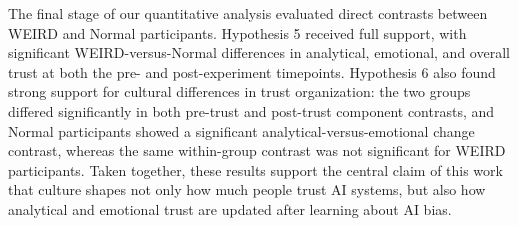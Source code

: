 The final stage of our quantitative analysis evaluated direct contrasts between WEIRD and Normal participants. Hypothesis 5 received full support, with significant WEIRD-versus-Normal differences in analytical, emotional, and overall trust at both the pre- and post-experiment timepoints. Hypothesis 6 also found strong support for cultural differences in trust organization: the two groups differed significantly in both pre-trust and post-trust component contrasts, and Normal participants showed a significant analytical-versus-emotional change contrast, whereas the same within-group contrast was not significant for WEIRD participants. Taken together, these results support the central claim of this work that culture shapes not only how much people trust AI systems, but also how analytical and emotional trust are updated after learning about AI bias.
